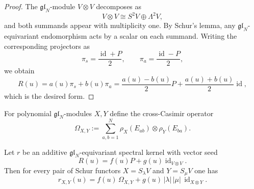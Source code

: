 \begin{proof}
The $\mathfrak{gl}_N$-module $V\otimes V$ decomposes as
\begin{equation}
V\otimes V\cong S^2V\oplus \Lambda^2V,
\end{equation}
and both summands appear with multiplicity one.  By Schur's lemma, any
$\mathfrak{gl}_N$-equivariant endomorphism acts by a scalar on each
summand.  Writing the corresponding projectors as
\begin{equation}
\pi_s=\frac{\operatorname{id}+P}{2},
\qquad
\pi_a=\frac{\operatorname{id}-P}{2},
\end{equation}
we obtain
\begin{equation}
R(u)=a(u)\pi_s+b(u)\pi_a
=\frac{a(u)-b(u)}{2}P+\frac{a(u)+b(u)}{2}\operatorname{id},
\end{equation}
which is the desired form.
\end{proof}

For polynomial $\mathfrak{gl}_N$-modules $X,Y$ define the cross-Casimir
operator
\begin{equation}
\Omega_{X,Y}:=\sum_{a,b=1}^N \rho_X(E_{ab})\otimes \rho_Y(E_{ba}).
\end{equation}

\begin{theorem}
\ClaimStatusProvedHere
\label{thm:schur-envelope-formula}
Let $r$ be an additive $\mathfrak{gl}_N$-equivariant spectral kernel with
vector seed
\begin{equation}
R(u)=f(u)P+g(u)\operatorname{id}_{V\otimes V}.
\end{equation}
Then for every pair of Schur functors $X=S_\lambda V$ and
$Y=S_\mu V$ one has
\begin{equation}
\label{eq:schur-envelope-formula}
r_{X,Y}(u)=f(u)\,\Omega_{X,Y}+g(u)\,|\lambda|\,|\mu|\,\operatorname{id}_{X\otimes Y}.
\end{equation}
\end{theorem}

